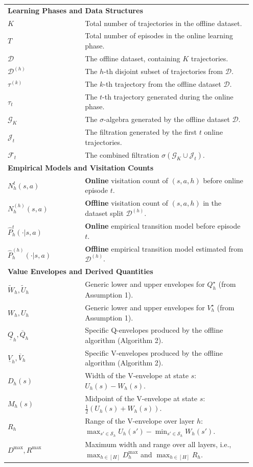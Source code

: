 \documentclass[twoside]{article}
\newcommand{\lowq}{\widetilde{W}} %
\newcommand{\highq}{\widetilde{U}} %
\newcommand{\lowv}{W} %
\newcommand{\highv}{U} %
\newcommand{\ohighv}{\overline{V}} %
\newcommand{\olowv}{\underline{V}} %
\newcommand{\ohighq}{\overline{Q}} %
\newcommand{\olowq}{\underline{Q}} %
\begin{document}
\begin{longtable}{@{}p{0.3\linewidth}p{0.65\linewidth}@{}}
\multicolumn{2}{l}{\textbf{Learning Phases and Data Structures}} \\[2pt]
$K$ & Total number of trajectories in the offline dataset. \\
$T$ & Total number of episodes in the online learning phase. \\
$\mathcal{D}$ & The offline dataset, containing $K$ trajectories. \\
$\mathcal{D}^{(h)}$ & The $h$-th disjoint subset of trajectories from $\mathcal{D}$. \\
$\tau^{(k)}$ & The $k$-th trajectory from the offline dataset $\mathcal{D}$. \\
$\tau_t$ & The $t$-th trajectory generated during the online phase. \\
$\mathcal{G}_K$ & The $\sigma$-algebra generated by the offline dataset $\mathcal{D}$. \\
$\mathcal{J}_t$ & The filtration generated by the first $t$ online trajectories. \\
$\mathcal{F}_t$ & The combined filtration $\sigma(\mathcal{G}_K \cup \mathcal{J}_t)$. \\

\multicolumn{2}{l}{\textbf{Empirical Models and Visitation Counts}} \\[2pt]
$N_h^t(s,a)$ & \textbf{Online} visitation count of $(s,a,h)$ before online episode $t$. \\
$N_h^{(h)}(s,a)$ & \textbf{Offline} visitation count of $(s,a,h)$ in the dataset split $\mathcal{D}^{(h)}$. \\
$\widehat{P}_h^t(\cdot|s,a)$ & \textbf{Online} empirical transition model before episode $t$. \\
$\widehat{P}_h^{(h)}(\cdot|s,a)$ & \textbf{Offline} empirical transition model estimated from $\mathcal{D}^{(h)}$. \\

\multicolumn{2}{l}{\textbf{Value Envelopes and Derived Quantities}} \\[2pt]
$\lowq_h, \highq_h$ & Generic lower and upper envelopes for $Q_h^\star$ (from Assumption 1). \\
$\lowv_h, \highv_h$ & Generic lower and upper envelopes for $V_h^\star$ (from Assumption 1). \\
$\olowq_h, \ohighq_h$ & Specific Q-envelopes produced by the offline algorithm (Algorithm 2). \\
$\olowv_h, \ohighv_h$ & Specific V-envelopes produced by the offline algorithm (Algorithm 2). \\
$D_h(s)$ & Width of the V-envelope at state $s$: $\highv_h(s) - \lowv_h(s)$. \\
$M_h(s)$ & Midpoint of the V-envelope at state $s$: $\frac{1}{2}(\highv_h(s) + \lowv_h(s))$. \\
$R_h$ & Range of the V-envelope over layer $h$: $\max_{s' \in \mathcal{S}_h} \highv_h(s') - \min_{s' \in \mathcal{S}_h} \lowv_h(s')$. \\
$D^{\max}, R^{\max}$ & Maximum width and range over all layers, i.e., $\max_{h \in [H]} D_h^{\max}$ and $\max_{h \in [H]} R_h$. \\


\end{longtable}
\end{document}
